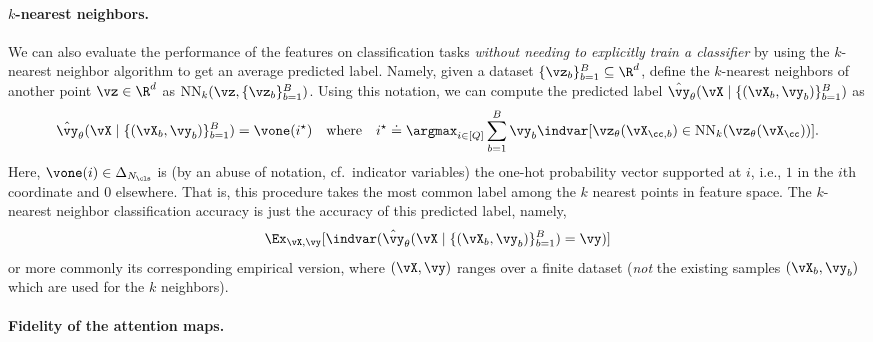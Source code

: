 \documentclass[../../book-main.tex]{subfiles}
\begin{document}
\paragraph{\(k\)-nearest neighbors.}  We can also evaluate the performance of the features on classification tasks \textit{without needing to explicitly train a classifier} by using the \(k\)-nearest neighbor algorithm to get an average predicted label. Namely, given a dataset \(\{\vz_{b}\}_{b = 1}^{B} \subseteq \R^{d}\), define the \(k\)-nearest neighbors of another point \(\vz \in \R^{d}\) as \(\operatorname{NN}_{k}(\vz, \{\vz_{b}\}_{b = 1}^{B})\). Using this notation, we can compute the predicted label \(\hat{\vy}_{\theta}(\vX \mid \{(\vX_{b}, \vy_{b})\}_{b = 1}^{B})\) as 
\begin{equation}
    \hat{\vy}_{\theta}(\vX \mid \{(\vX_{b}, \vy_{b})\}_{b = 1}^{B}) = \vone(i^{\star}) \quad \text{where} \quad i^{\star} \doteq \argmax_{i \in [Q]}\sum_{b = 1}^{B}\vy_{b}\indvar[\vz_{\theta}(\vX_{\cc, b}) \in \operatorname{NN}_{k}(\vz_{\theta}(\vX_{\cc}))].
\end{equation}
Here, \(\vone(i) \in \Delta_{N_{\cls}}\) is (by an abuse of notation, cf.~indicator variables) the one-hot probability vector supported at \(i\), i.e., \(1\) in the \(i\)th coordinate and \(0\) elsewhere. That is, this procedure takes the most common label among the \(k\) nearest points in feature space. The \(k\)-nearest neighbor classification accuracy is just the accuracy of this predicted label, namely,
\begin{equation}
    \Ex_{\vX, \vy}[\indvar(\hat{\vy}_{\theta}(\vX \mid \{(\vX_{b}, \vy_{b})\}_{b = 1}^{B}) = \vy)]
\end{equation}
or more commonly its corresponding empirical version, where \((\vX, \vy)\) ranges over a finite dataset (\textit{not} the existing samples \((\vX_{b}, \vy_{b})\) which are used for the \(k\) neighbors).

\paragraph{Fidelity of the attention maps.}
\end{document}
